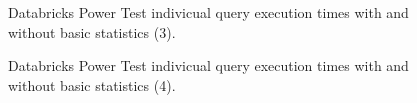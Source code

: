 \begin{figure}
   \begin{center}
   \end{center}
   \caption{Databricks Power Test indivicual query execution times with and without basic statistics (3).}
   \label{fig:additionalResultsDatabricksWithBasicStatsPowerTestIndividualQueries3}
\end{figure}

\begin{figure}
   \begin{center}
   \end{center}
   \caption{Databricks Power Test indivicual query execution times with and without basic statistics (4).}
   \label{fig:additionalResultsDatabricksWithBasicStatsPowerTestIndividualQueries4}
\end{figure}

